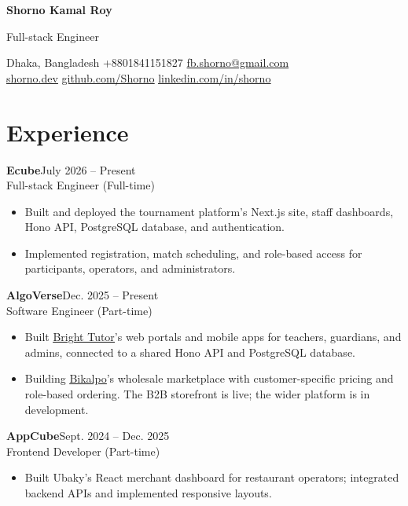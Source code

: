 \documentclass[letterpaper,11pt]{article}
\newcommand{\role}[3]{%
  \noindent\textbf{#1}\hfill{\small\color{secondary}#2}\\[1pt]
  {\small #3}\par
}
\newenvironment{details}{%
  \begin{itemize}[leftmargin=0.15in,label=\textbullet,itemsep=2pt,topsep=3pt,parsep=0pt,partopsep=0pt]
  \small
}{\end{itemize}}
\begin{document}
{\fontsize{26}{29}\selectfont\bfseries Shorno Kamal Roy}\par
\vspace{3pt}
{\large Full-stack Engineer}\par
\vspace{6pt}
{\small
  Dhaka, Bangladesh\enspace\textbar\enspace
  +8801841151827\enspace\textbar\enspace
  \href{mailto:fb.shorno@gmail.com}{fb.shorno@gmail.com}\\[2pt]
  \href{https://shorno.dev}{\underline{shorno.dev}}\enspace\textbar\enspace
  \href{https://github.com/Shorno}{\underline{github.com/Shorno}}\enspace\textbar\enspace
  \href{https://www.linkedin.com/in/shorno/}{\underline{linkedin.com/in/shorno}}
}\par

\section{Experience}

\role{Ecube}{July 2026 -- Present}{Full-stack Engineer (Full-time)}
\begin{details}
  \item Built and deployed the tournament platform's Next.js site, staff dashboards, Hono API, PostgreSQL database, and authentication.
  \item Implemented registration, match scheduling, and role-based access for participants, operators, and administrators.
\end{details}
\vspace{3pt}

\role{AlgoVerse}{Dec. 2025 -- Present}{Software Engineer (Part-time)}
\begin{details}
  \item Built \href{https://brighteducations.com/}{\underline{Bright Tutor}}'s web portals and mobile apps for teachers, guardians, and admins, connected to a shared Hono API and PostgreSQL database.
  \item Building \href{https://b2b.bikalpo.com/}{\underline{Bikalpo}}'s wholesale marketplace with customer-specific pricing and role-based ordering. The B2B storefront is live; the wider platform is in development.
\end{details}
\vspace{3pt}

\role{AppCube}{Sept. 2024 -- Dec. 2025}{Frontend Developer (Part-time)}
\begin{details}
  \item Built Ubaky's React merchant dashboard for restaurant operators; integrated backend APIs and implemented responsive layouts.
\end{details}
\end{document}
